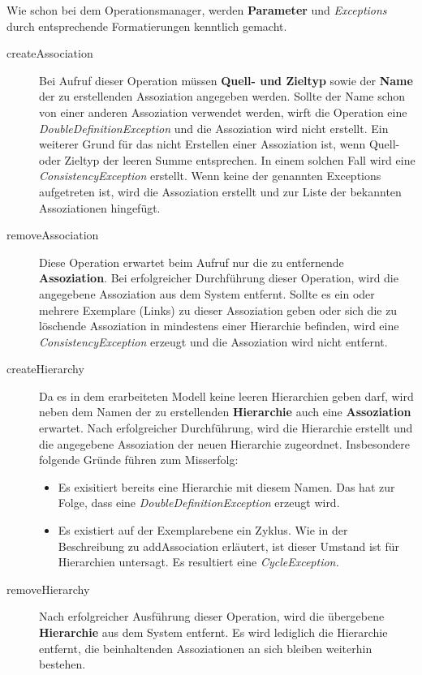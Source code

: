 Wie schon bei dem Operationsmanager, werden \textbf{Parameter} und \emph{Exceptions} durch entsprechende Formatierungen kenntlich gemacht.

\begin{description}
\item[createAssociation] Bei Aufruf dieser Operation müssen \textbf{Quell- und Zieltyp} sowie der \textbf{Name} der zu erstellenden Assoziation 
angegeben werden.
Sollte der Name schon von einer anderen Assoziation verwendet werden, wirft die Operation eine \emph{DoubleDefinitionException} und die Assoziation wird nicht
erstellt. Ein weiterer Grund für das nicht Erstellen einer Assoziation ist, wenn Quell- oder Zieltyp der leeren Summe entsprechen. In einem solchen Fall
wird eine \emph{ConsistencyException} erstellt.
Wenn keine der genannten Exceptions aufgetreten ist, wird die Assoziation erstellt und zur Liste der bekannten Assoziationen hingefügt. 
\item[removeAssociation] Diese Operation erwartet beim Aufruf nur die zu entfernende \textbf{Assoziation}. 
Bei erfolgreicher Durchführung dieser Operation, wird die
angegebene Assoziation aus dem System entfernt.
Sollte es ein oder mehrere Exemplare (Links) zu dieser Assoziation geben oder sich die zu löschende Assoziation in mindestens einer Hierarchie befinden, wird eine \emph{ConsistencyException} erzeugt und die Assoziation wird nicht entfernt. 
\item[createHierarchy] Da es in dem erarbeiteten Modell keine leeren Hierarchien geben darf, wird neben dem Namen der zu erstellenden \textbf{Hierarchie} auch eine 
\textbf{Assoziation} erwartet. Nach erfolgreicher Durchführung, wird die Hierarchie erstellt und die angegebene Assoziation der neuen Hierarchie zugeordnet.
Insbesondere folgende Gründe führen zum Misserfolg:
\begin{itemize}
\item Es exisitiert bereits eine Hierarchie mit diesem Namen. Das hat zur Folge, dass eine \emph{DoubleDefinitionException} erzeugt wird.
\item Es existiert auf der Exemplarebene ein Zyklus. Wie in der Beschreibung zu addAssociation erläutert, ist dieser Umstand ist für Hierarchien untersagt.
 Es resultiert eine \emph{CycleException.}
\end{itemize}
\item[removeHierarchy] Nach erfolgreicher Ausführung dieser Operation, wird die übergebene \textbf{Hierarchie} aus dem System entfernt. 
Es wird lediglich die Hierarchie entfernt, die beinhaltenden Assoziationen an sich bleiben weiterhin bestehen.

\end{description}
